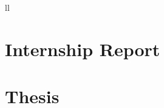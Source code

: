 \documentclass[
11pt, %
english,
singlespacing, %
headsepline, %
]{BachelorThesis} %
\begin{document}
\begin{abbreviations}{ll}
\end{abbreviations}


\mainmatter %

\pagestyle{thesis} %

\part{Internship Report}

 

 
 



\part{Thesis}

 

 
 




\printbibliography[title={References}]

\end{document}
